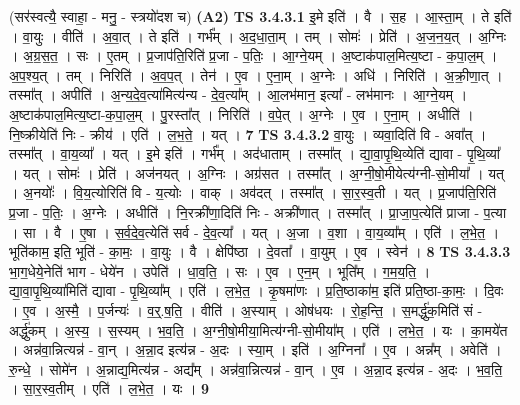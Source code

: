 \documentclass[17pt]{extarticle}
\begin{document}
                  \newline
                      (सर॑स्वत्यै॒ स्वाहा॒ - मनु॒ - स्त्रयो॑दश च)  \textbf{(A2)} \newline \newline
                                \textbf{ TS 3.4.3.1} \newline
                  इ॒मे इति॑ । वै । स॒ह । आ॒स्ता॒म् । ते इति॑ । वा॒युः । वीति॑ । अ॒वा॒त् । ते इति॑ । गर्भ᳚म् । अ॒द॒धा॒ता॒म् । तम् । सोमः॑ । प्रेति॑ । अ॒ज॒न॒य॒त् । अ॒ग्निः । अ॒ग्र॒स॒त॒ । सः । ए॒तम् । प्र॒जाप॑ति॒रिति॑ प्र॒जा - प॒तिः॒ । आ॒ग्ने॒यम् । अ॒ष्टाक॑पाल॒मित्य॒ष्टा - क॒पा॒ल॒म् । अ॒प॒श्य॒त् । तम् । निरिति॑ । अ॒व॒प॒त् । तेन॑ । ए॒व । ए॒ना॒म् । अ॒ग्नेः । अधि॑ । निरिति॑ । अ॒क्री॒णा॒त् । तस्मा᳚त् । अपीति॑ । अ॒न्य॒दे॒व॒त्या॑मित्य॑न्य - दे॒व॒त्या᳚म् । आ॒लभ॑मान॒ इत्या᳚ - लभ॑मानः । आ॒ग्ने॒यम् । अ॒ष्टाक॑पाल॒मित्य॒ष्टा-क॒पा॒ल॒म् । पु॒रस्ता᳚त् । निरिति॑ । व॒पे॒त् । अ॒ग्नेः । ए॒व । ए॒ना॒म् । अधीति॑ । नि॒ष्क्रीयेति॑ निः - क्रीय॑ । एति॑ । ल॒भ॒ते॒ । यत् । \textbf{  7} \newline
                  \newline
                                \textbf{ TS 3.4.3.2} \newline
                  वा॒युः । व्यवा॒दिति॑ वि - अवा᳚त् । तस्मा᳚त् । वा॒य॒व्या᳚ । यत् । इ॒मे इति॑ । गर्भ᳚म् । अद॑धाताम् । तस्मा᳚त् । द्या॒वा॒पृ॒थि॒व्येति॑ द्यावा - पृ॒थि॒व्या᳚ । यत् । सोमः॑ । प्रेति॑ । अज॑नयत् । अ॒ग्निः । अग्र॑सत । तस्मा᳚त् । अ॒ग्नी॒षो॒मीयेत्य॑ग्नी-सो॒मीया᳚ । यत् । अ॒नयोः᳚ । वि॒य॒त्योरिति॑ वि - य॒त्योः । वाक् । अव॑दत् । तस्मा᳚त् । सा॒र॒स्व॒ती । यत् । प्र॒जाप॑ति॒रिति॑ प्र॒जा - प॒तिः॒ । अ॒ग्नेः । अधीति॑ । नि॒रक्री॑णा॒दिति॑ निः - अक्री॑णात् । तस्मा᳚त् । प्रा॒जा॒प॒त्येति॑ प्राजा - प॒त्या । सा । वै । ए॒षा । स॒र्व॒दे॒व॒त्येति॑ सर्व - दे॒व॒त्या᳚ । यत् । अ॒जा । व॒शा । वा॒य॒व्या᳚म् । एति॑ । ल॒भे॒त॒ । भूति॑काम॒ इति॒ भूति॑ - का॒मः॒ । वा॒युः । वै । क्षेपि॑ष्ठा । दे॒वता᳚ । वा॒युम् । ए॒व । स्वेन॑ । \textbf{  8} \newline
                  \newline
                                \textbf{ TS 3.4.3.3} \newline
                  भा॒ग॒धेये॒नेति॑ भाग - धेये॑न । उपेति॑ । धा॒व॒ति॒ । सः । ए॒व । ए॒न॒म् । भूति᳚म् । ग॒म॒य॒ति॒ । द्या॒वा॒पृ॒थि॒व्या॑मिति॑ द्यावा - पृ॒थि॒व्या᳚म् । एति॑ । ल॒भे॒त॒ । कृ॒षमा॑णः । प्र॒ति॒ष्ठाका॑म॒ इति॑ प्रति॒ष्ठा-का॒मः॒ । दि॒वः । ए॒व । अ॒स्मै॒ । प॒र्जन्यः॑ । व॒र्॒.ष॒ति॒ । वीति॑ । अ॒स्याम् । ओष॑धयः । रो॒ह॒न्ति॒ । स॒मर्द्धु॑क॒मिति॑ सं - अर्द्धु॑कम् । अ॒स्य॒ । स॒स्यम् । भ॒व॒ति॒ । अ॒ग्नी॒षो॒मीया॒मित्य॑ग्नी-सो॒मीया᳚म् । एति॑ । ल॒भे॒त॒ । यः । का॒मये॑त । अन्न॑वा॒न्नित्यन्न॑ - वा॒न् । अ॒न्ना॒द इत्य॑न्न - अ॒दः । स्या॒म् । इति॑ । अ॒ग्निना᳚ । ए॒व । अन्न᳚म् । अवेति॑ । रु॒न्धे॒ । सोमे॑न । अ॒न्नाद्य॒मित्य॑न्न - अद्य᳚म् । अन्न॑वा॒न्नित्यन्न॑ - वा॒न् । ए॒व । अ॒न्ना॒द इत्य॑न्न - अ॒दः । भ॒व॒ति॒ । सा॒र॒स्व॒तीम् । एति॑ । ल॒भे॒त॒ । यः । \textbf{  9} \newline
\end{document}
